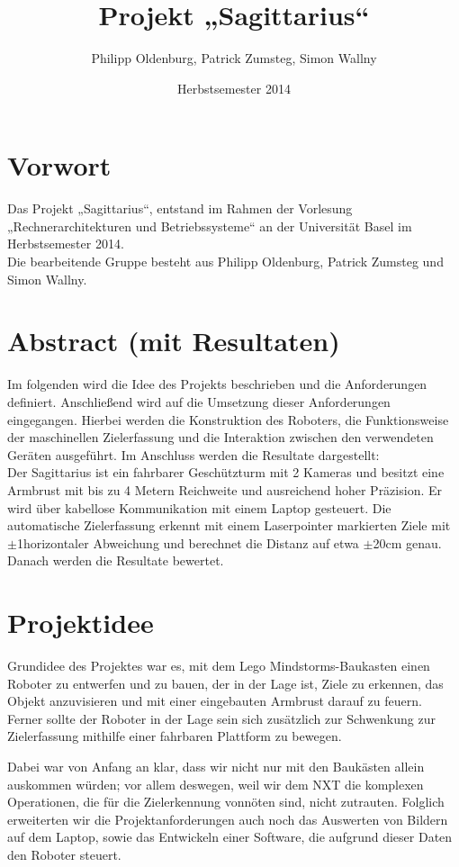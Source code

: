 \documentclass[12pt,a4paper]{article}
\author{Philipp Oldenburg, Patrick Zumsteg, Simon Wallny}
\title{Projekt „Sagittarius“}
\date{Herbstsemester 2014}
\begin{document}
\maketitle
\tableofcontents
\section{Vorwort}
Das Projekt „Sagittarius“, entstand im Rahmen der Vorlesung „Rechnerarchitekturen und Betriebssysteme“ an der Universität Basel im Herbstsemester 2014.\hfill\\
Die bearbeitende Gruppe besteht aus Philipp Oldenburg, Patrick Zumsteg und Simon Wallny.
\newpage
\section{Abstract (mit Resultaten)}
Im folgenden wird die Idee des Projekts beschrieben und die Anforderungen definiert. Anschließend wird auf die Umsetzung dieser Anforderungen eingegangen. Hierbei werden die Konstruktion des Roboters, die Funktionsweise der maschinellen Zielerfassung und die Interaktion zwischen den verwendeten Geräten ausgeführt. Im Anschluss werden die Resultate dargestellt:\hfill\\
Der Sagittarius ist ein fahrbarer Geschützturm mit 2 Kameras und besitzt eine Armbrust mit bis zu 4 Metern Reichweite und ausreichend hoher Präzision. Er wird über kabellose Kommunikation mit einem Laptop gesteuert. Die automatische Zielerfassung erkennt mit einem Laserpointer markierten Ziele mit $\pm$1\degree horizontaler Abweichung und berechnet die Distanz auf etwa $\pm$20cm genau.\hfill\\
Danach werden die Resultate bewertet.

\section{Projektidee}

Grundidee des Projektes war es, mit dem Lego Mindstorms-Baukasten einen Roboter zu entwerfen und zu bauen, der in der Lage ist, Ziele zu erkennen, das Objekt anzuvisieren und mit einer eingebauten Armbrust darauf zu feuern.
Ferner sollte der Roboter in der Lage sein sich zusätzlich zur Schwenkung zur Zielerfassung mithilfe einer fahrbaren Plattform zu bewegen.

Dabei war von Anfang an klar, dass wir nicht nur mit den Baukästen allein auskommen würden; vor allem deswegen, weil wir dem NXT die komplexen Operationen, die für die Zielerkennung vonnöten sind, nicht zutrauten. Folglich erweiterten wir die Projektanforderungen auch noch das Auswerten von Bildern auf dem Laptop, sowie das Entwickeln einer Software, die aufgrund dieser Daten den Roboter steuert.
\end{document}
